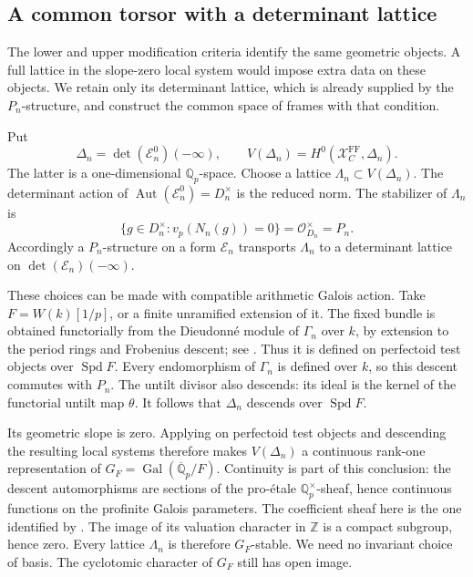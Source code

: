 \documentclass[11pt]{article}
\numberwithin{equation}{section}
\theoremstyle{definition}
\theoremstyle{remark}
\begin{document}
\subsection{A common torsor with a determinant lattice}

The lower and upper modification criteria identify the same geometric
objects. A full lattice in the slope-zero local system would impose
extra data on these objects. We retain only its determinant lattice,
which is already supplied by the $P_n$-structure, and construct the
common space of frames with that condition.

Put
\[
 \Delta_n=\det(\mathcal E_n^0)(-\infty),\qquad
 V(\Delta_n)=H^0(\mathcal X_C^{\mathrm{FF}},\Delta_n).
\]
The latter is a one-dimensional $\mathbb Q_p$-space.  Choose a lattice
$\Lambda_n\subset V(\Delta_n)$.
The determinant action of
$\operatorname{Aut}(\mathcal E_n^0)=D_n^\times$ is the reduced norm.
The stabilizer of $\Lambda_n$ is
\[
 \{g\in D_n^\times:v_p(N_n(g))=0\}
       =\mathcal O_{D_n}^{\times}=P_n.
\]
Accordingly a $P_n$-structure on a form $\mathcal E_n$ transports
$\Lambda_n$ to a determinant lattice on
$\det(\mathcal E_n)(-\infty)$.

These choices can be made with compatible arithmetic Galois action.
Take $F=W(k)[1/p]$, or a finite unramified extension of it.
The fixed bundle is obtained functorially from the Dieudonn\'e module
of $\Gamma_n$ over $k$, by extension to the period rings and Frobenius
descent; see \cite[Lemma 2.3.3 and the following paragraph,
pp.~23--24]{BMR2026}.  Thus it is defined on perfectoid test objects
over $\operatorname{Spd} F$.  Every endomorphism of $\Gamma_n$ is defined over $k$,
so this descent commutes with $P_n$.  The untilt divisor also descends:
its ideal is the kernel of the functorial untilt map $\theta$.
It follows that $\Delta_n$ descends over $\operatorname{Spd} F$.

Its geometric slope is zero.  Applying
\cite[Corollary II.2.20]{FS} on perfectoid test objects and descending
the resulting local systems therefore makes $V(\Delta_n)$ a
continuous rank-one representation of
$G_F=\operatorname{Gal}(\overline{\mathbb Q}_p/F)$.
Continuity is part of this conclusion: the descent automorphisms are
sections of the pro-\'etale $\mathbb Q_p^\times$-sheaf, hence continuous
functions on the profinite Galois parameters.  The coefficient sheaf
here is the one identified by \cite[Proposition II.2.5(ii)]{FS}.
The image of its valuation character in $\mathbb Z$ is a compact subgroup,
hence zero.  Every lattice $\Lambda_n$ is therefore $G_F$-stable.
We need no invariant choice of basis.  The cyclotomic character of
$G_F$ still has open image.
\end{document}
